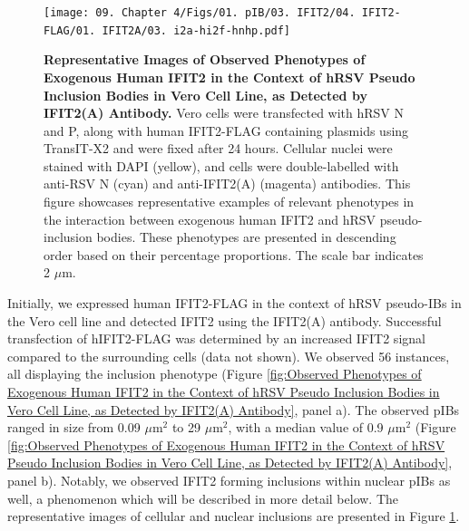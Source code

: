 \begin{figure}
    \centering
    \texttt{[image: 09. Chapter 4/Figs/01. pIB/03. IFIT2/04. IFIT2-FLAG/01. IFIT2A/03. i2a-hi2f-hnhp.pdf]}
    \caption[Representative Images of Observed Phenotypes of Exogenous Human IFIT2 in the Context of hRSV Pseudo Inclusion Bodies in Vero Cell Line, as Detected by IFIT2(A) Antibody.]{\textbf{Representative Images of Observed Phenotypes of Exogenous Human IFIT2 in the Context of hRSV Pseudo Inclusion Bodies in Vero Cell Line, as Detected by IFIT2(A) Antibody.} Vero cells were transfected with hRSV N and P, along with human IFIT2-FLAG containing plasmids using TransIT-X2 and were fixed after 24 hours. Cellular nuclei were stained with DAPI (yellow), and cells were double-labelled with anti-RSV N (cyan) and anti-IFIT2(A) (magenta) antibodies. This figure showcases representative examples of relevant phenotypes in the interaction between exogenous human IFIT2 and hRSV pseudo-inclusion bodies. These phenotypes are presented in descending order based on their percentage proportions. The scale bar indicates 2 \(\mu \mbox{m}\).}
    \label{fig:Representative Images of Observed Phenotypes of Exogenous Human IFIT2 in the Context of hRSV Pseudo Inclusion Bodies in Vero Cell Line, as Detected by IFIT2(A) Antibody}
\end{figure}

Initially, we expressed human IFIT2-FLAG in the context of hRSV pseudo-IBs in the Vero cell line and detected IFIT2 using the IFIT2(A) antibody. Successful transfection of hIFIT2-FLAG was determined by an increased IFIT2 signal compared to the surrounding cells (data not shown). We observed 56 instances, all displaying the inclusion phenotype (Figure \ref{fig:Observed Phenotypes of Exogenous Human IFIT2 in the Context of hRSV Pseudo Inclusion Bodies in Vero Cell Line, as Detected by IFIT2(A) Antibody}, panel a). The observed pIBs ranged in size from 0.09 \(\mu \mbox{m}^2\) to 29 \(\mu \mbox{m}^2\), with a median value of 0.9 \(\mu \mbox{m}^2\) (Figure \ref{fig:Observed Phenotypes of Exogenous Human IFIT2 in the Context of hRSV Pseudo Inclusion Bodies in Vero Cell Line, as Detected by IFIT2(A) Antibody}, panel b). Notably, we observed IFIT2 forming inclusions within nuclear pIBs as well, a phenomenon which will be described in more detail below. The representative images of cellular and nuclear inclusions are presented in Figure \ref{fig:Representative Images of Observed Phenotypes of Exogenous Human IFIT2 in the Context of hRSV Pseudo Inclusion Bodies in Vero Cell Line, as Detected by IFIT2(A) Antibody}.


